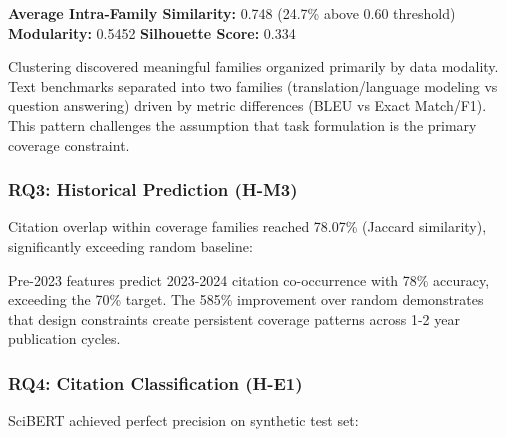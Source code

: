 \textbf{Average Intra-Family Similarity:} 0.748 (24.7\% above 0.60 threshold)  
\textbf{Modularity:} 0.5452  
\textbf{Silhouette Score:} 0.334

Clustering discovered meaningful families organized primarily by data modality. Text benchmarks separated into two families (translation/language modeling vs question answering) driven by metric differences (BLEU vs Exact Match/F1). This pattern challenges the assumption that task formulation is the primary coverage constraint.

\subsubsection{RQ3: Historical Prediction (H-M3)}

Citation overlap within coverage families reached 78.07\% (Jaccard similarity), significantly exceeding random baseline:

\begin{table}[htbp]
\centering
{}
\end{table}

Pre-2023 features predict 2023-2024 citation co-occurrence with 78\% accuracy, exceeding the 70\% target. The 585\% improvement over random demonstrates that design constraints create persistent coverage patterns across 1-2 year publication cycles.

\subsubsection{RQ4: Citation Classification (H-E1)}

SciBERT achieved perfect precision on synthetic test set:

\begin{table}[htbp]
\centering
{}
\end{table}

